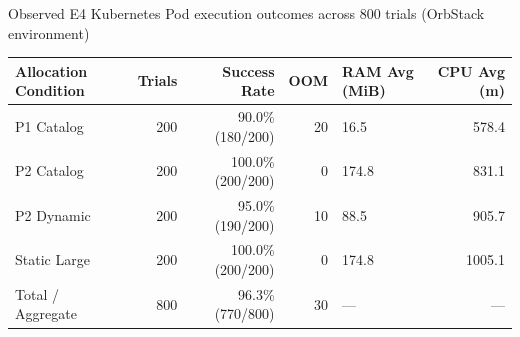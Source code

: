 \begin{table}[ht]{Observed E4 Kubernetes Pod execution outcomes across 800 trials (OrbStack environment)}
\label{tab:e4-results}
\centering
\small
\begin{tabular}{p{2.8cm}rrrp{2.4cm}r}
\toprule
Allocation Condition & Trials & Success Rate & OOM & RAM Avg (MiB) & CPU Avg (m) \\
\midrule
P1 Catalog & 200 & 90.0\% (180/200) & 20 & 16.5 & 578.4 \\
P2 Catalog & 200 & 100.0\% (200/200) & 0 & 174.8 & 831.1 \\
P2 Dynamic & 200 & 95.0\% (190/200) & 10 & 88.5 & 905.7 \\
Static Large & 200 & 100.0\% (200/200) & 0 & 174.8 & 1005.1 \\
\midrule
Total / Aggregate & 800 & 96.3\% (770/800) & 30 & --- & --- \\
\bottomrule
\end{tabular}
\end{table}
